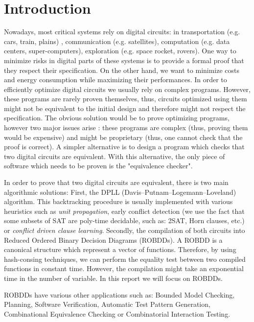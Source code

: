 \documentclass[a4paper,10pt]{article}
\begin{document}
\section{Introduction}

Nowadays, most critical systems rely on digital circuits: in transportation (e.g. cars, train, plains) , communication (e.g. satellites), computation (e.g. data centers, super-computers), exploration (e.g. space rocket, rovers).
One way to minimize risks in digital parts of these systems is to provide a formal proof that they respect their specification.
On the other hand, we want to minimize costs and energy consumption while maximizing their performances.
In order to efficiently optimize digital circuits we usually rely on complex programs.
However, these programs are rarely proven themselves, thus, circuits optimized using them might not be equivalent to the initial design and therefore might not respect the specification.
The obvious solution would be to prove optimizing programs, however two major issues arise : these programs are complex  (thus, proving them would be expensive) and might be proprietary (thus, one cannot check that the proof is correct).
A simpler alternative is to design a program which checks that two digital circuits are equivalent.
With this alternative, the only piece of software which needs to be proven is the "equivalence checker".


In order to prove that two digital circuits are equivalent, there is two main algorithmic solutions:
First, the DPLL (Davis–Putnam–Logemann–Loveland) algorithm.
This backtracking procedure is usually implemented with various heuristics such as \textit{unit propagation}, early conflict detection (we use the fact that some subsets of SAT are poly-time decidable, such as: 2SAT, Horn clauses, etc.) or \textit{conflict driven clause learning}.
Secondly, the compilation of both circuits into Reduced Ordered Binary Decision Diagrams (ROBDDs).
A ROBDD is a canonical structure which represent a vector of functions.
Therefore, by using hash-consing techniques, we can perform the equality test between two compiled functions in constant time.
However, the compilation might take an exponential time in the number of variable.
In this report we will focus on ROBDDs.


ROBDDs have various other applications such as: Bounded Model Checking, Planning, Software Verification, Automatic Test Pattern Generation, Combinational Equivalence Checking or Combinatorial Interaction Testing.
\end{document}
